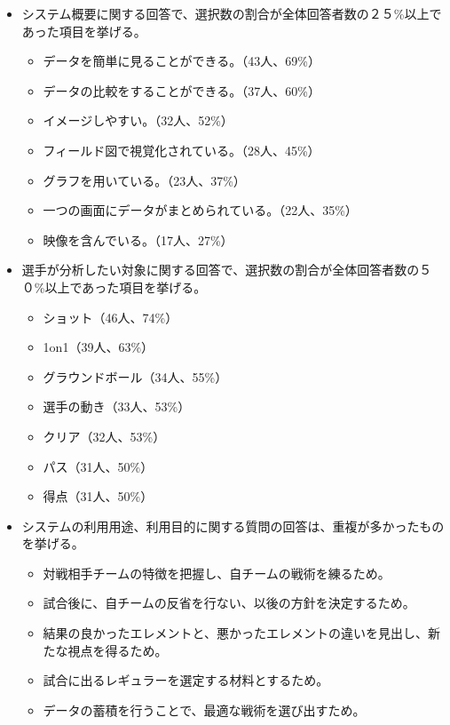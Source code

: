 \documentclass[sotsuron]{kuee}
\begin{document}
\begin{itemize}
\item システム概要に関する回答で、選択数の割合が全体回答者数の２５\%以上であった項目を挙げる。
	\begin{itemize}
	\item データを簡単に見ることができる。（43人、69\%）
	\item データの比較をすることができる。（37人、60\%）
	\item イメージしやすい。（32人、52\%）
	\item フィールド図で視覚化されている。（28人、45\%）
	\item グラフを用いている。（23人、37\%）
	\item 一つの画面にデータがまとめられている。（22人、35\%）
	\item 映像を含んでいる。（17人、27\%）
	\end{itemize}
\item 選手が分析したい対象に関する回答で、選択数の割合が全体回答者数の５０\%以上であった項目を挙げる。
	\begin{itemize}
	\item ショット（46人、74\%）
	\item 1on1（39人、63\%）
	\item グラウンドボール（34人、55\%）
	\item 選手の動き（33人、53\%）
	\item クリア（32人、53\%）
	\item パス（31人、50\%）
	\item 得点（31人、50\%）
	\end{itemize}
\item システムの利用用途、利用目的に関する質問の回答は、重複が多かったものを挙げる。
	\begin{itemize}
	\item 対戦相手チームの特徴を把握し、自チームの戦術を練るため。
	\item 試合後に、自チームの反省を行ない、以後の方針を決定するため。
	\item 結果の良かったエレメントと、悪かったエレメントの違いを見出し、新たな視点を得るため。
	\item 試合に出るレギュラーを選定する材料とするため。
	\item データの蓄積を行うことで、最適な戦術を選び出すため。
	\end{itemize}
\end{itemize}
\end{document}
